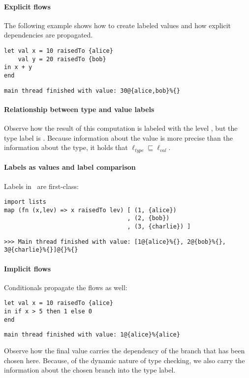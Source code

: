 \paragraph{Explicit flows}
The following example shows how to create labeled values and how explicit dependencies are propagated.
\begin{lstlisting}
let val x = 10 raisedTo {alice}
    val y = 20 raisedTo {bob}
in x + y
end
\end{lstlisting}
\begin{verbatim}
main thread finished with value: 30@{alice,bob}%{}
\end{verbatim}



\paragraph{Relationship between type and value labels}
Observe how the result of this computation is labeled with 
the level , but the type label is \lev{}.
Because information about the value is more precise than the information about the type, it holds that 
$\ell_{\mathit{type}} \sqsubseteq \ell_{\mathit{val}}$. 



\paragraph{Labels as values and label comparison}
Labels in \troupelang\ are first-class:

\begin{lstlisting}
import lists
map (fn (x,lev) => x raisedTo lev) [ (1, {alice})
                                   , (2, {bob})
                                   , (3, {charlie}) ]
\end{lstlisting}
\begin{lstlisting}
>>> Main thread finished with value: [1@{alice}%{}, 2@{bob}%{}, 
3@{charlie}%{}]@{}%{}    
\end{lstlisting}
\paragraph{Implicit flows}
Conditionals propagate the flows as well:


\begin{lstlisting}
let val x = 10 raisedTo {alice} 
in if x > 5 then 1 else 0 
end	
\end{lstlisting}
\begin{verbatim}
main thread finished with value: 1@{alice}%{alice}	
\end{verbatim}
Observe how the final value carries the dependency of the 
branch that has been chosen here. Because, of the dynamic nature of type checking,
we also carry the information about the chosen branch into the type label.

